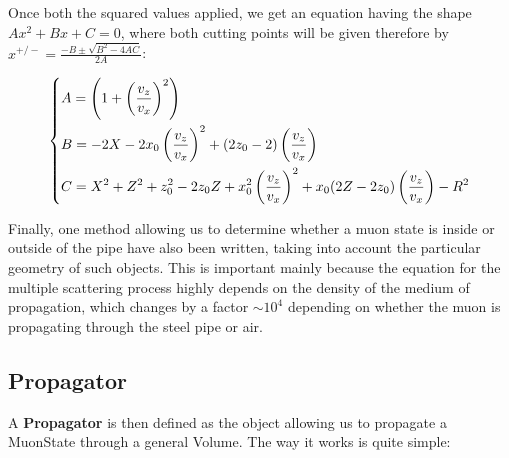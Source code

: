 \documentclass[a4paper, 11pt, twoside, openright]{report}
\begin{document}
Once both the squared values applied, we get an equation having the shape $Ax^2 + Bx + C = 0$, where both cutting points will be given therefore by $x^{+/-} = \frac{-B \pm \sqrt{B^2 - 4 AC}}{2A}$:

\begin{equation}
\label{eq:lines}
\begin{dcases}
A = \left (1 + \left (\frac{v_z}{v_x} \right )^2 \right ) \\
B = -2X - 2 x_0 \left (\frac{v_z}{v_x} \right )^2 + (2 z_0 - 2) \left (\frac{v_z}{v_x} \right ) \\
C = X^2 + Z^2 + z_0^2 - 2 z_0 Z + x_0^2 \left (\frac{v_z}{v_x} \right )^2 + x_0 (2 Z - 2 z_0) \left (\frac{v_z}{v_x} \right ) - R^2
\end{dcases}
\end{equation}

Finally, one method allowing us to determine whether a muon state is inside or outside of the pipe have also been written, taking into account the particular geometry of such objects. This is important mainly because the equation for the multiple scattering process highly depends on the density of the medium of propagation, which changes by a factor $\sim10^4$ depending on whether the muon is propagating through the steel pipe or air.

\subsection{Propagator}

A \textbf{Propagator} is then defined as the object allowing us to propagate a MuonState through a general Volume. The way it works is quite simple: 
\end{document}
